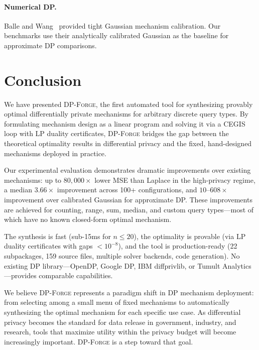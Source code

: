 \documentclass[11pt,a4paper]{article}
\newcommand{\dpforge}{\textsc{DP-Forge}}
\begin{document}
\paragraph{Numerical DP.}
Balle and Wang~\cite{balle2018improving} provided tight Gaussian mechanism
calibration.  Our benchmarks use their analytically calibrated Gaussian as the
baseline for approximate DP comparisons.

\section{Conclusion}
\label{sec:conclusion}

We have presented \dpforge{}, the first automated tool for synthesizing provably
optimal differentially private mechanisms for arbitrary discrete query types.
By formulating mechanism design as a linear program and solving it via a CEGIS
loop with LP duality certificates, \dpforge{} bridges the gap between the
theoretical optimality results in differential privacy and the fixed,
hand-designed mechanisms deployed in practice.

Our experimental evaluation demonstrates dramatic improvements over existing
mechanisms: up to $80{,}000\times$ lower MSE than Laplace in the high-privacy
regime, a median $3.66\times$ improvement across 100+ configurations, and
$10$--$608\times$ improvement over calibrated Gaussian for approximate DP.
These improvements are achieved for counting, range, sum, median, and custom
query types---most of which have no known closed-form optimal mechanism.

The synthesis is fast (sub-15ms for $n \le 20$), the optimality is provable
(via LP duality certificates with gaps $< 10^{-8}$), and the tool is
production-ready (22 subpackages, 159 source files, multiple solver backends,
code generation).  No existing DP library---OpenDP, Google DP, IBM diffprivlib,
or Tumult Analytics---provides comparable capabilities.

We believe \dpforge{} represents a paradigm shift in DP mechanism deployment:
from selecting among a small menu of fixed mechanisms to automatically
synthesizing the optimal mechanism for each specific use case.  As differential
privacy becomes the standard for data release in government, industry, and
research, tools that maximize utility within the privacy budget will become
increasingly important.  \dpforge{} is a step toward that goal.
\end{document}

